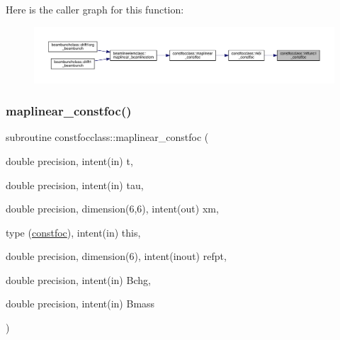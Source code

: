 Here is the caller graph for this function\+:\nopagebreak
\begin{figure}[H]
\begin{center}
\leavevmode
\includegraphics[width=350pt]{namespaceconstfocclass_a6cedac4005af8166900c4d4b1afd707b_icgraph}
\end{center}
\end{figure}
\mbox{\label{namespaceconstfocclass_af393c0fed039b82c7eb2aa347bc12bd8}} 
\subsubsection{\texorpdfstring{maplinear\_constfoc()}{maplinear\_constfoc()}}
{\footnotesize\ttfamily subroutine constfocclass\+::maplinear\+\_\+constfoc (\begin{DoxyParamCaption}\item[{double precision, intent(in)}]{t,  }\item[{double precision, intent(in)}]{tau,  }\item[{double precision, dimension(6,6), intent(out)}]{xm,  }\item[{type (\mbox{\hyperlink{namespaceconstfocclass_structconstfocclass_1_1constfoc}{constfoc}}), intent(in)}]{this,  }\item[{double precision, dimension(6), intent(inout)}]{refpt,  }\item[{double precision, intent(in)}]{Bchg,  }\item[{double precision, intent(in)}]{Bmass }\end{DoxyParamCaption})}

